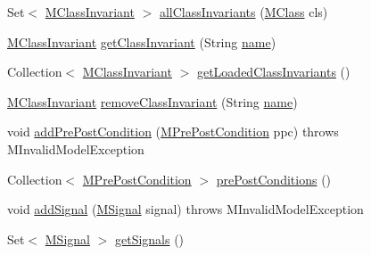\begin{DoxyCompactItemize}
\item 
Set$<$ \hyperlink{classorg_1_1tzi_1_1use_1_1uml_1_1mm_1_1_m_class_invariant}{M\-Class\-Invariant} $>$ \hyperlink{classorg_1_1tzi_1_1use_1_1uml_1_1mm_1_1_m_model_a15f403b7e1b4282d0956fe62a36dbd3c}{all\-Class\-Invariants} (\hyperlink{interfaceorg_1_1tzi_1_1use_1_1uml_1_1mm_1_1_m_class}{M\-Class} cls)
\item 
\hyperlink{classorg_1_1tzi_1_1use_1_1uml_1_1mm_1_1_m_class_invariant}{M\-Class\-Invariant} \hyperlink{classorg_1_1tzi_1_1use_1_1uml_1_1mm_1_1_m_model_a391fb19c663b70f5825272f9d36e364c}{get\-Class\-Invariant} (String \hyperlink{classorg_1_1tzi_1_1use_1_1uml_1_1mm_1_1_m_model_element_impl_ac9997b04c10d247c21c22d431d99400d}{name})
\item 
Collection$<$ \hyperlink{classorg_1_1tzi_1_1use_1_1uml_1_1mm_1_1_m_class_invariant}{M\-Class\-Invariant} $>$ \hyperlink{classorg_1_1tzi_1_1use_1_1uml_1_1mm_1_1_m_model_a13497768f21f4478b2c85805640af5af}{get\-Loaded\-Class\-Invariants} ()
\item 
\hyperlink{classorg_1_1tzi_1_1use_1_1uml_1_1mm_1_1_m_class_invariant}{M\-Class\-Invariant} \hyperlink{classorg_1_1tzi_1_1use_1_1uml_1_1mm_1_1_m_model_a03bd3ae9652dd5cf3caffc894c6b3761}{remove\-Class\-Invariant} (String \hyperlink{classorg_1_1tzi_1_1use_1_1uml_1_1mm_1_1_m_model_element_impl_ac9997b04c10d247c21c22d431d99400d}{name})
\item 
void \hyperlink{classorg_1_1tzi_1_1use_1_1uml_1_1mm_1_1_m_model_ae81cf33c7f3d0e1858a77de719cdcfea}{add\-Pre\-Post\-Condition} (\hyperlink{classorg_1_1tzi_1_1use_1_1uml_1_1mm_1_1_m_pre_post_condition}{M\-Pre\-Post\-Condition} ppc)  throws M\-Invalid\-Model\-Exception 
\item 
Collection$<$ \hyperlink{classorg_1_1tzi_1_1use_1_1uml_1_1mm_1_1_m_pre_post_condition}{M\-Pre\-Post\-Condition} $>$ \hyperlink{classorg_1_1tzi_1_1use_1_1uml_1_1mm_1_1_m_model_afee7151095a04d8e7f0805731ce53870}{pre\-Post\-Conditions} ()
\item 
void \hyperlink{classorg_1_1tzi_1_1use_1_1uml_1_1mm_1_1_m_model_a061de5c5d2e50c4130bb23c5830812e7}{add\-Signal} (\hyperlink{interfaceorg_1_1tzi_1_1use_1_1uml_1_1mm_1_1commonbehavior_1_1communications_1_1_m_signal}{M\-Signal} signal)  throws M\-Invalid\-Model\-Exception 
\item 
Set$<$ \hyperlink{interfaceorg_1_1tzi_1_1use_1_1uml_1_1mm_1_1commonbehavior_1_1communications_1_1_m_signal}{M\-Signal} $>$ \hyperlink{classorg_1_1tzi_1_1use_1_1uml_1_1mm_1_1_m_model_aeaf164addf0cde11f5b2d537428439d7}{get\-Signals} ()
\item 

\end{DoxyCompactItemize}
